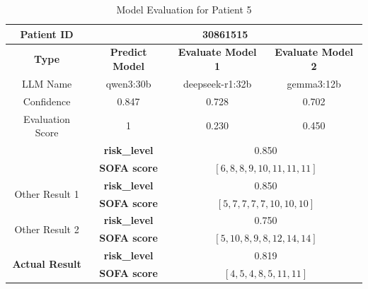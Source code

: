 \begin{table}[htbp]
 \centering
 \caption{Model Evaluation for Patient 5}
 \label{tab:patient5}
 \begin{tabular}{cccc}
 \toprule
 \textbf{ Patient ID } & \multicolumn{3}{c}{30861515} \\
 \midrule
 \textbf{ Type } & \textbf{ Predict Model } & \textbf{ Evaluate Model 1 } & \textbf{ Evaluate Model 2 } \\
 LLM Name & qwen3:30b & deepseek-r1:32b & gemma3:12b \\
 Confidence & 0.847 & 0.728 & 0.702 \\
 Evaluation Score & 1 & 0.230 & 0.450 \\
 \midrule
 \addlinespace
 \multirow{2}{*}{\textbf{ Best Result }} & \textbf{ risk\_level } & \multicolumn{2}{c}{0.850} \\
      & \textbf{ SOFA score } & \multicolumn{2}{c}{$[6, 8, 8, 9, 10, 11, 11, 11]$} \\
 \midrule
 \multirow{2}{*}{Other Result 1} & \textbf{ risk\_level } & \multicolumn{2}{c}{0.850} \\
      & \textbf{ SOFA score } & \multicolumn{2}{c}{$[5, 7, 7, 7, 7, 10, 10, 10]$} \\
 \midrule
 \multirow{2}{*}{Other Result 2} & \textbf{ risk\_level } & \multicolumn{2}{c}{0.750} \\
      & \textbf{ SOFA score } & \multicolumn{2}{c}{$[5, 10, 8, 9, 8, 12, 14, 14]$} \\
 \midrule
 \multirow{2}{*}{\textbf{ Actual Result }} & \textbf{ risk\_level } & \multicolumn{2}{c}{0.819} \\
      & \textbf{ SOFA score } & \multicolumn{2}{c}{$[4, 5, 4, 8, 5, 11, 11]$} \\
 \bottomrule
 \end{tabular}
\end{table}

